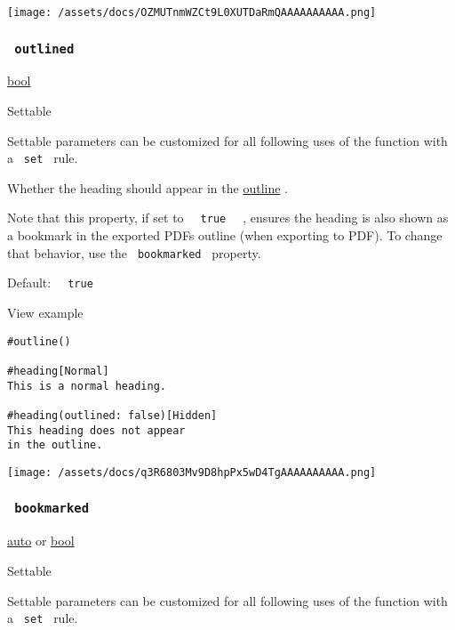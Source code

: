 \texttt{[image: /assets/docs/OZMUTnmWZCt9L0XUTDaRmQAAAAAAAAAA.png]}

\subsubsection{\texorpdfstring{\texttt{\ outlined\ }}{ outlined }}\label{parameters-outlined}

\href{/docs/reference/foundations/bool/}{bool}

{{ Settable }}

\label{parameters-outlined-settable-tooltip}
Settable parameters can be customized for all following uses of the
function with a \texttt{\ set\ } rule.

Whether the heading should appear in the
\href{/docs/reference/model/outline/}{outline} .

Note that this property, if set to
\texttt{\ }{\texttt{\ true\ }}\texttt{\ } , ensures the heading is also
shown as a bookmark in the exported PDF\textquotesingle s outline (when
exporting to PDF). To change that behavior, use the
\texttt{\ bookmarked\ } property.

Default: \texttt{\ }{\texttt{\ true\ }}\texttt{\ }


View example

\begin{verbatim}
#outline()

#heading[Normal]
This is a normal heading.

#heading(outlined: false)[Hidden]
This heading does not appear
in the outline.
\end{verbatim}

\texttt{[image: /assets/docs/q3R6803Mv9D8hpPx5wD4TgAAAAAAAAAA.png]}

\subsubsection{\texorpdfstring{\texttt{\ bookmarked\ }}{ bookmarked }}\label{parameters-bookmarked}

\href{/docs/reference/foundations/auto/}{auto} {or}
\href{/docs/reference/foundations/bool/}{bool}

{{ Settable }}

\label{parameters-bookmarked-settable-tooltip}
Settable parameters can be customized for all following uses of the
function with a \texttt{\ set\ } rule.

